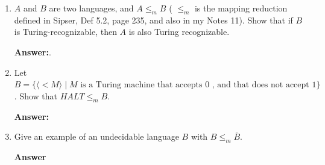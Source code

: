 \documentclass[11pt]{article}
\begin{document}
\newpage




\begin{enumerate}[label=\textbf{Exercise \arabic{*}}]

\item $A$ and $B$ are two languages, and $A \le_m B$ ( $\le_m$ is the mapping reduction defined in Sipser, Def 5.2, page 235, and also in my Notes 11). Show that if $B$ is Turing-recognizable, then $A$ is also Turing recognizable.

\medskip



\textbf{Answer:}. 

\item Let $B =\{\langle<M\rangle \mid \textrm{$M$ is a Turing machine that accepts 0 , and that does  not accept 1}\}$. Show that $HALT \le_m B$.
\medskip 

\textbf{Answer:}

\item Give an example of an undecidable language $B$ with $B \le_m \overline{B}$.
\medskip

\textbf{Answer}
\end{enumerate}




 
\end{document}
